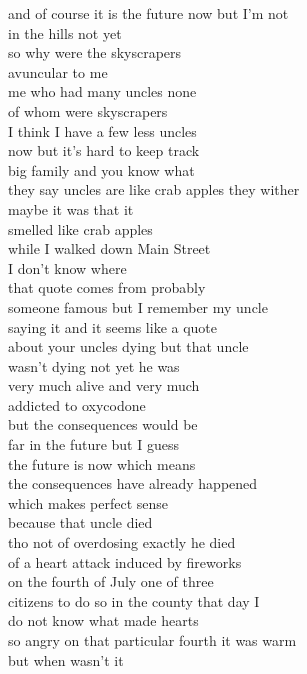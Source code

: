 \begin{flushleft}
\begin{paracol}{3}
and of course it is the future now but I’m not\\
in the hills not yet\\
so why were the skyscrapers\\
avuncular to me\\
me who had many uncles none\\
of whom were skyscrapers\\
I think I have a few less uncles\\
now but it’s hard to keep track\\
big family and you know what\\
they say uncles are like crab apples they wither\\
maybe it was that it\\
smelled like crab apples\\
while I walked down Main Street\\
\switchcolumn[2]
I don’t know where\\
that quote comes from probably\\
someone famous but I remember my uncle\\
saying it and it seems like a quote\\
about your uncles dying but that uncle\\
wasn’t dying not yet he was\\
very much alive and very much\\
addicted to oxycodone\\
but the consequences would be\\
far in the future but I guess\\
the future is now which means\\
the consequences have already happened\\
which makes perfect sense\\
because that uncle died\\
tho not of overdosing exactly he died\\
of a heart attack induced by fireworks\\
on the fourth of July one of three\\
citizens to do so in the county that day I\\
do not know what made hearts\\
so angry on that particular fourth it was warm\\
but when wasn’t it\\
\end{paracol}
\end{flushleft}